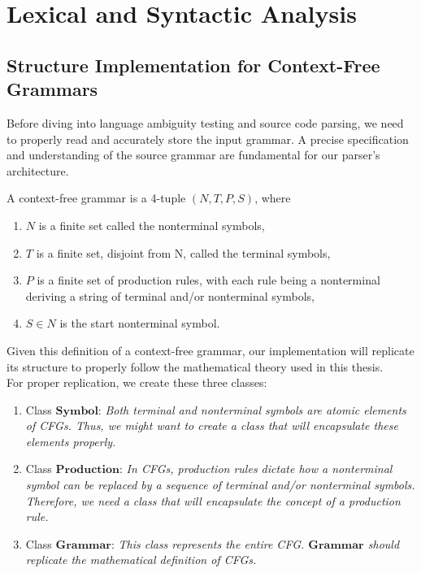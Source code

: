\chapter{Lexical and Syntactic Analysis}\label{ch:Lexical and Syntactic Analysis}

\newpage


\section{Structure Implementation for Context-Free Grammars}\label{sec:Structure Implementation for Context-Free Grammars}

Before diving into language ambiguity testing and source code parsing, we need to properly read and accurately store the input grammar. A precise specification and understanding of the source grammar are fundamental for our parser’s architecture.\\

\begin{definition}[1.0]
    A context-free grammar is a 4-tuple \((N, T, P, S)\), where
    \begin{enumerate}
        \item \(N\) is a finite set called the nonterminal symbols,
        \item \(T\) is a finite set, disjoint from N, called the terminal symbols,
        \item \(P\) is a finite set of production rules, with each rule being a nonterminal deriving a string of terminal and/or nonterminal symbols,
        \item \(S \in N\) is the start nonterminal symbol.
    \end{enumerate}
\end{definition}
\setlength{\parindent}{0pt}

Given this definition of a context-free grammar, our implementation will replicate its structure to properly follow the mathematical theory used in this thesis.\\

For proper replication, we create these three classes:
\begin{enumerate}
    \item Class \(\boldsymbol{Symbol}\): \textit{Both terminal and nonterminal symbols are atomic elements of CFGs. Thus, we might want to create a class that will encapsulate these elements properly.}
    \item Class \(\boldsymbol{Production}\): \textit{In CFGs, production rules dictate how a nonterminal symbol can be replaced by a sequence of terminal and/or nonterminal symbols. Therefore, we need a class that will encapsulate the concept of a production rule.}
    \item Class \(\boldsymbol{Grammar}\): \textit{This class represents the entire CFG. \(\boldsymbol{Grammar}\) should replicate the mathematical definition of CFGs.}
\end{enumerate}

